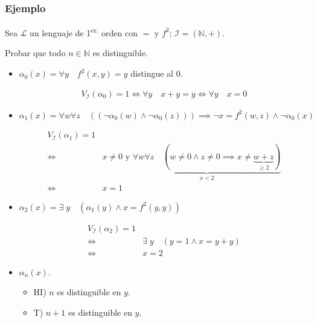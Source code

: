 \subsubsection{Ejemplo}

%
Sea $\mathcal{L}$ un lenguaje de 1\textsuperscript{er.} orden con $=$ y $f^2$;
$\mathcal{I} = (\mathbb{N}, +)$.

Probar que todo $n \in \mathbb{N}$ es distinguible.

\begin{itemize}
    \item $\alpha_0(x) = \forall y \quad f^2(x,y) = y$ distingue al $0$.

        \begin{gather*}
            V_{\mathcal{I}}(\alpha_0) = 1
            \iff \forall y \quad x + y = y 
            \iff \forall y \quad x = 0
        \end{gather*}

    \item $\alpha_1(x) = \forall w \forall z \quad ((\neg \alpha_0(w) \wedge
        \neg \alpha_0(z))) \implies \neg x = f^2(w,z) \wedge \neg \alpha_0(x)$

        \begin{align*}
            V_{\mathcal{I}}(\alpha_1) = 1 \\
            \iff & x \neq 0 \text{ y }
            \underbrace{\forall w \forall z \quad (w \neq 0 \wedge z \neq 0
            \implies x \neq \underbrace{w + z}_{\geq 2})}_{x < 2} \\
            \iff & x = 1
        \end{align*}

    \item $\alpha_2(x) = \exists \; y \quad (\alpha_1(y) \wedge x = f^2(y,y))$

        \begin{align*}
            V_{\mathcal{I}}(\alpha_2) = 1 \\
            \iff & \exists \; y \quad (y=1 \wedge x = y+y) \\
            \iff & x = 2
        \end{align*}

    \item $\alpha_n(x)$.

        \begin{itemize}
            \item HI) $n$ es distinguible en $y$.
            \item T) $n+1$ es distinguible en $y$.
        \end{itemize}


\end{itemize}
